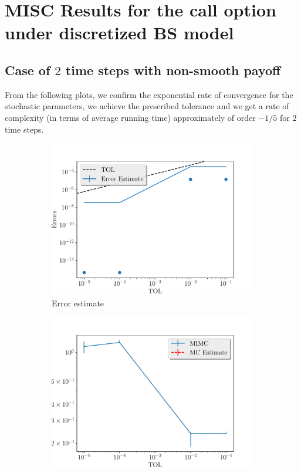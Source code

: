 \documentclass[11pt]{article}
\begin{document}
\section{ MISC Results for the call option under discretized BS model}\label{app: MISC Results 1D_BS}

\subsection{Case of $2$ time steps with non-smooth payoff}

From the following plots, we confirm the exponential rate of convergence for the stochastic parameters, we achieve the prescribed tolerance and  we get a rate of complexity (in terms of average running time) approximately of order $-1/5$ for $2$ time steps.
\begin{figure}[!h]
	\centering
	\begin{subfigure}{.5\textwidth}
		\centering
		\includegraphics[width=1\linewidth]{./figures/1D_BS_2_steps_non_smooth/error_estimate.pdf}
		\caption{Error estimate}
		\label{fig:misc_1D_BS_non_smooth_2steps_sub1}
	\end{subfigure}%
	\begin{subfigure}{.5\textwidth}
		\centering
		\includegraphics[width=1\linewidth]{./figures/1D_BS_2_steps_non_smooth/average_running_time.pdf}

\end{subfigure}
\end{figure}
\end{document}
